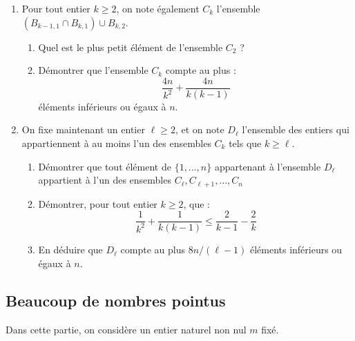 \documentclass[landscape,twocolumn,leqno,a4paper,10pt]{report} %
\newcommand\n{\noindent}
\renewcommand{\geq}{\geqslant}
\renewcommand{\leq}{\leqslant}
\begin{document}
\begin{enumerate}
\begin{enumerate}
		\item Démontrer que l'ensemble $B_{k, 1}$ compte au plus $n \times \pi_{2^{k}} / 2^{k}$ éléments inférieurs ou égaux à $n$.
		\item En déduire que l'ensemble $B_{k, 1}$ compte au plus $2 n / k$ éléments inférieurs ou égaux à $n$.
		\item Soit $p_{1}$ et $p_{2}$ deux nombres premiers distincts. Démontrer que le nombre d'entiers naturels non nuls inférieurs ou égaux à $n$ et multiples de $p_{1}$ et $p_{2}$ est au plus de $n/\left(p_{1} \times p_{2}\right)$.
		\item En déduire que l'ensemble $B_{k, 2}$ compte au plus $4 n / k^{2}$ éléments inférieurs ou égaux à $n$.
	\end{enumerate}
	\item Pour tout entier $k \geq 2$, on note également $C_{k}$ l'ensemble $\left(B_{k-1,1} \cap B_{k, 1}\right) \cup B_{k, 2}$.
	\begin{enumerate}
		\item Quel est le plus petit élément de l'ensemble $C_{2}$ ?
		\item Démontrer que l'ensemble $C_{k}$ compte au plus :
		$$\frac{4 n}{k^{2}}+\frac{4 n}{k(k-1)}$$
		éléments inférieurs ou égaux à $n$.
	\end{enumerate}
	\item On fixe maintenant un entier $\ell \geq 2$, et on note $D_{\ell}$ l'ensemble des entiers qui appartiennent à au moins l'un des ensembles $C_{k}$ tels que $k \geq \ell$.
	\begin{enumerate}
		\item Démontrer que tout élément de $\{1, \ldots, n\}$ appartenant à l'ensemble $D_{\ell}$ appartient à l'un des ensembles $C_{\ell}, C_{\ell+1}, \ldots, C_{n}$
		\item Démontrer, pour tout entier $k \geq 2$, que :
		$$\frac{1}{k^{2}}+\frac{1}{k(k-1)} \leq \frac{2}{k-1}-\frac{2}{k}$$
		\item En déduire que $D_{\ell}$ compte au plus $8 n /(\ell-1)$ éléments inférieurs ou égaux à $n$.
	\end{enumerate}
\end{enumerate}


\subsection{Beaucoup de nombres pointus}

\n Dans cette partie, on considère un entier naturel non nul $m$ fixé.
\end{document}

